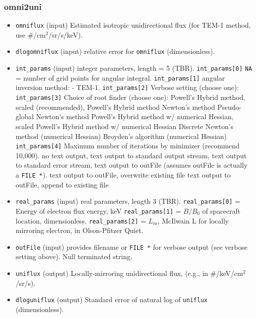 \documentclass{article}    %
\begin{document}
\subsubsection{omni2uni}
\begin{itemize}
\item \verb|omniflux|  (input) Estimated isotropic unidirectional flux (for TEM-1 method, use \#/cm$^2$/sr/s/keV).
\item \verb|dlogomniflux| (input) relative error for \verb|omniflux| (dimensionless).
\item \verb|int_params| (input) integer parameters, length = 5 (TBR).
\subitem \verb|int_params[0]| \verb|NA| = number of grid points for angular integral.
\subitem \verb|int_params[1]| angular inversion method:
\subsubitem[-1] - TEM-1.
\subitem \verb|int_params[2]| Verbose setting (choose one):
\subitem \verb|int_params[3]| Choice of root finder (choose one):
\subsubitem[0] Powell's Hybrid method, scaled (recommended),
\subsubitem[1] Powell's Hybrid method
\subsubitem[2] Newton's method
\subsubitem[3] Pseudo-global Newton's method
\subsubitem[4] Powell's Hybrid method w/ numerical Hessian, scaled
\subsubitem[5] Powell's Hybrid method w/ numerical Hessian
\subsubitem[6] Discrete Newton's method  (numerical Hessian)
\subsubitem[7] Broyden's algorithm (numerical Hessian)
\subitem \verb|int_params[4]| Maximum number of iterations by minimizer (recommend 10,000).
\subsubitem[0] no text output,
\subsubitem[1] text output to standard output stream,
\subsubitem[2] text output to standard error stream,
\subsubitem[3] text output to outFile (assumes outFile is actually a \verb|FILE *|).
\subsubitem[4] text output to outFile, overwrite existing file
\subsubitem[5] text output to outFile, append to existing file
\item \verb|real_params| (input) real parameters, length 3 (TBR).
\subitem \verb|real_params[0]| = Energy of electron flux energy, keV
\subitem \verb|real_params[1]| = $B/B_0$ of spacecraft location, dimensionless.
\subitem \verb|real_params[2]| = $L_m$, McIlwain L for locally mirroring electron, in Olson-Pfitzer Quiet.
\item \verb|outFile| (input) provides filename or \verb|FILE *| for verbose output (see verbose setting above). Null terminated string.
\item \verb|uniflux| (output) Locally-mirroring unidirectional flux, (e.g., in \#/keV/cm$^2$/sr/s).
\item \verb|dloguniflux| (output) Standard error of natural log of \verb|uniflux| (dimensionless).
\end{itemize}
\end{document}
